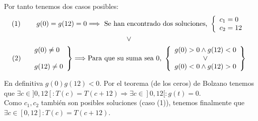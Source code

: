 \documentclass[12pt]{article}
\begin{document}
\begin{ejercicio}[2 puntos]
        Por tanto tenemos dos casos posibles:
        \begin{gather*}
            (1) \hspace{0.8cm} g(0)=g(12)=0 \Longrightarrow \text{ Se han encontrado dos soluciones, } \left\{
            \begin{array}{l}
                c_1=0\\
                c_2=12
            \end{array}
            \right.\\
            \vee \\
            (2) \hspace{0.4cm} \left.
            \begin{array}{l}
                g(0) \neq 0\\\\
                g(12) \neq 0 
            \end{array}
            \right\} \Longrightarrow \text{Para que su suma sea $0$, }
            \left\{
            \begin{array}{c}
                g(0)>0 \wedge g(12)<0\\
                \vee\\
                g(0)<0 \wedge g(12)>0\\
            \end{array}
            \right\}
        \end{gather*}

        En definitiva $g(0)g(12)<0$. Por el teorema (de los ceros) de Bolzano tenemos que $\exists c \in ]0,12[ : T(c)=T(c+12) \Longrightarrow \exists c \in ]0,12[ : g(t)=0$.\\

        Como $c_1,c_2$ también son posibles soluciones (caso (1)), tenemos finalmente que $\exists c \in [0,12] : T(c)=T(c+12)$.
        
            

    \end{ejercicio}
\end{document}
